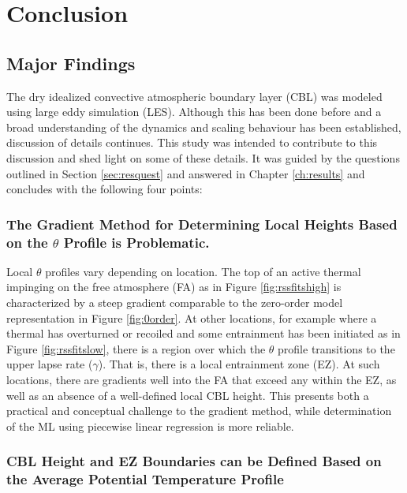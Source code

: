 
\chapter{Conclusion}
\label{ch:conc}
\setlength{\parindent}{0cm}

\section{Major Findings}

The dry idealized convective atmospheric boundary layer (\acs{CBL}) was modeled using large eddy simulation (\acs{LES}).  Although this has been done before and a broad understanding of the dynamics and scaling behaviour has been established, discussion of details continues.  This study was intended to contribute to this discussion and shed light on some of these details.  It was guided by the questions outlined in Section \ref{sec:resquest} and answered in Chapter \ref{ch:results} and concludes with the following four points:    


\subsection{The Gradient Method for Determining Local Heights Based on the $\theta$ Profile is Problematic.}

Local $\theta$ profiles vary depending on location.  The top of an active thermal impinging on the free atmosphere (\acs{FA}) as in Figure \ref{fig:rssfitshigh} is characterized by a steep gradient comparable to the zero-order model representation in Figure \ref{fig:0order}.  At other locations, for example where a thermal has overturned or recoiled and some entrainment has been initiated as in Figure \ref{fig:rssfitslow}, there is a region over which the $\theta$ profile transitions to the upper lapse rate ($\gamma$). That is, there is a local entrainment zone (\acs{EZ}).  At such locations, there are gradients well into the \acs{FA} that exceed any within the \acs{EZ}, as well as an absence of a well-defined local \acs{CBL} height.  This presents both a practical and conceptual challenge to the gradient method, while determination of the \acs{ML} using piecewise linear regression is more reliable. 

\subsection{\acs{CBL} Height and \acs{EZ} Boundaries can be Defined Based on the Average Potential Temperature Profile}

